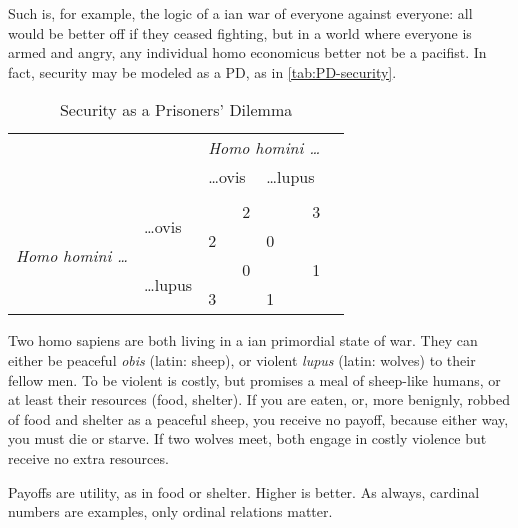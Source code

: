 Such is, for example, the logic of a \citeauthor{Hobbes-1651-aa}ian war of everyone against everyone: all would be better off if they ceased fighting, but in a world where everyone is armed and angry, any individual homo economicus better not be a pacifist. 
In fact, security may be modeled as a \gls{PD}, as in \autoref{tab:PD-security}. 

\begin{table}
	\caption{Security as a Prisoners' Dilemma}
	\label{tab:PD-security}
	\begin{center}
	\begin{tabular}
		{m{1cm}
		m{}
		m{}
		m{}
		m{}}
	
& 
& \multicolumn{2}{c}{\emph{Homo homini \ldots}}
\\


& 
&\ldots ovis 
& \ldots lupus
\\\\ %

\cline{3-4}


\multicolumn{1}{c}{\multirow{4}{*}{\emph{Homo homini \ldots}}} 
& \multirow{2}{2,3cm}{\ldots ovis} 
& 	\multicolumn{1}{|r|}{2} 
& \multicolumn{1}{r|}{3}
\\ 


\multicolumn{1}{c}{} 
& \multicolumn{1}{c}{}
& \multicolumn{1}{|l|}{2} 
& \multicolumn{1}{l|}{0}
\\ 

\cline{3-4}

\multicolumn{1}{c}{} 
& \multirow{2}{2,3cm}{\ldots lupus} 
& \multicolumn{1}{|r|}{0} 
& \multicolumn{1}{r|}{1}
\\ 


\multicolumn{1}{c}{} 
& \multicolumn{1}{c}{}
& \multicolumn{1}{|l|}{3} 
& \multicolumn{1}{l|}{1}
\\ 

\cline{3-4}
\end{tabular}
\end{center}
\scriptsize{
	Two homo sapiens are both living in a \citeauthor{Hobbes-1651-aa}ian primordial state of war. 
	They can either be peaceful \emph{obis} (latin: sheep), or violent \emph{lupus} (latin: wolves) to their fellow men. 
	To be violent is costly, but promises a meal of sheep-like humans, or at least their resources (food, shelter). 
	If you are eaten, or, more benignly, robbed of food and shelter as a peaceful sheep, you receive no payoff, because either way, you must die or starve. 
	If two wolves meet, both engage in costly violence but receive no extra resources.
	
	Payoffs are utility, as in food or shelter. 
	Higher is better. 
	As always, cardinal numbers are examples, only ordinal relations matter.}
\end{table}

